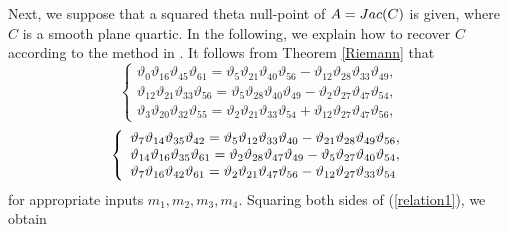 \documentclass{amsart}
\theoremstyle{definition}
\theoremstyle{plain}
\begin{document}
Next, we suppose that a squared theta null-point of $A = {\rm Jac}(C)$ is given, where $C$ is a smooth plane quartic.
In the following, we explain how to recover $C$ according to the method in \cite[$\S 6.4$]{Milio}. It follows from Theorem \ref{Riemann} that\smallskip
\begin{equation}\label{relation1}
    \left\{
    \begin{array}{l}
        \vartheta_0\vartheta_{16}\vartheta_{45}\vartheta_{61} = \vartheta_5\vartheta_{21}\vartheta_{40}\vartheta_{56} - \vartheta_{12}\vartheta_{28}\vartheta_{33}\vartheta_{49},\\
        \vartheta_{12}\vartheta_{21}\vartheta_{33}\vartheta_{56} = \vartheta_5\vartheta_{28}\vartheta_{40}\vartheta_{49} - \vartheta_2\vartheta_{27}\vartheta_{47}\vartheta_{54},\\
        \vartheta_3\vartheta_{20}\vartheta_{32}\vartheta_{55} = \vartheta_2\vartheta_{21}\vartheta_{33}\vartheta_{54} + \vartheta_{12}\vartheta_{27}\vartheta_{47}\vartheta_{56},
    \end{array}
    \right.
\end{equation}\vspace{-2mm}
\begin{equation}
    \left\{
    \begin{array}{l}\label{relation2}
    \vartheta_7\vartheta_{14}\vartheta_{35}\vartheta_{42} = \vartheta_5\vartheta_{12}\vartheta_{33}\vartheta_{40} -\vartheta_{21}\vartheta_{28}\vartheta_{49}\vartheta_{56},\\
    \vartheta_{14}\vartheta_{16}\vartheta_{35}\vartheta_{61} = \vartheta_2\vartheta_{28}\vartheta_{47}\vartheta_{49} - \vartheta_5\vartheta_{27}\vartheta_{40}\vartheta_{54},\\
    \vartheta_7\vartheta_{16}\vartheta_{42}\vartheta_{61} = \vartheta_2\vartheta_{21}\vartheta_{47}\vartheta_{56} -  \vartheta_{12}\vartheta_{27}\vartheta_{33}\vartheta_{54} 
    \end{array}
    \right.\smallskip
\end{equation}
for appropriate inputs $m_1,m_2,m_3,m_4$.
Squaring both sides of (\ref{relation1}), we obtain\smallskip
\end{document}
